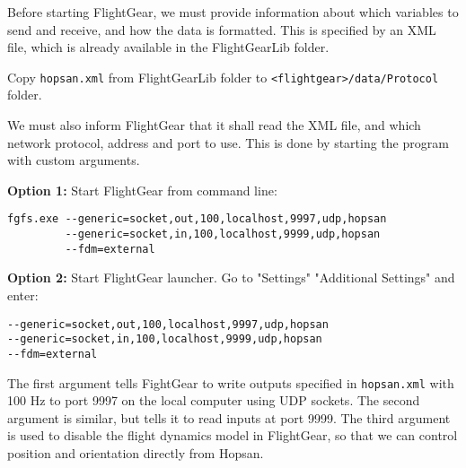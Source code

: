 \documentclass[a4paper]{article}
\begin{document}
\begin{tutenumerate}
Before starting FlightGear, we must provide information about which variables to send and receive, and how the data is formatted. This is specified by an XML file, which is already available in the FlightGearLib folder.

Copy \texttt{hopsan.xml} from FlightGearLib folder to \texttt{<flightgear>/data/Protocol} folder.

We must also inform FlightGear that it shall read the XML file, and which network protocol, address and port to use. This is done by starting the program with custom arguments.

\textbf{Option 1:} Start FlightGear from command line:
\begin{lstlisting}[frame=single]
fgfs.exe --generic=socket,out,100,localhost,9997,udp,hopsan
         --generic=socket,in,100,localhost,9999,udp,hopsan
         --fdm=external
\end{lstlisting}

\textbf{Option 2:} Start FlightGear launcher. Go to "Settings" \textrightarrow "Additional Settings" and enter:
\begin{lstlisting}[frame=single]
--generic=socket,out,100,localhost,9997,udp,hopsan
--generic=socket,in,100,localhost,9999,udp,hopsan
--fdm=external
\end{lstlisting}

The first argument tells FightGear to write outputs specified in \texttt{hopsan.xml} with 100 Hz to port 9997 on the local computer using UDP sockets. The second argument is similar, but tells it to read inputs at port 9999. The third argument is used to disable the flight dynamics model in FlightGear, so that we can control position and orientation directly from Hopsan.
\end{tutenumerate}
\end{document}
